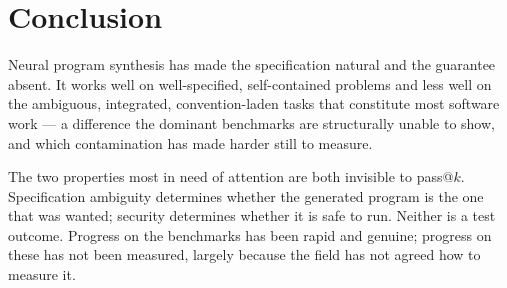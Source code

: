 \documentclass[11pt,a4paper]{article}
\begin{document}
\section{Conclusion}
\label{sec:conclusion}

Neural program synthesis has made the specification natural and the guarantee
absent. It works well on well-specified, self-contained problems and less well
on the ambiguous, integrated, convention-laden tasks that constitute most
software work --- a difference the dominant benchmarks are structurally unable
to show, and which contamination has made harder still to measure.

The two properties most in need of attention are both invisible to pass@$k$.
Specification ambiguity determines whether the generated program is the one
that was wanted; security determines whether it is safe to run. Neither is a
test outcome. Progress on the benchmarks has been rapid and genuine; progress
on these has not been measured, largely because the field has not agreed how
to measure it.
\end{document}
